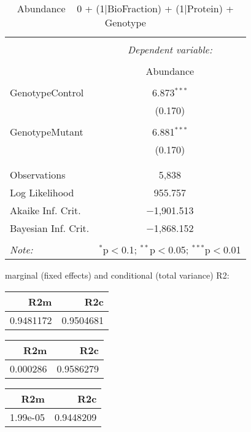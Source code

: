\documentclass[11pt]{report}
\begin{document}
\begin{table}[!htbp] \centering 
  \caption{Abundance ~ 0 + (1|BioFraction) + (1|Protein) + Genotype} 
  \label{} 
\begin{tabular}{@{\extracolsep{5pt}}lc} 
\\[-1.8ex]\hline 
\hline \\[-1.8ex] 
 & \multicolumn{1}{c}{\textit{Dependent variable:}} \\ 
\cline{2-2} 
\\[-1.8ex] & Abundance \\ 
\hline \\[-1.8ex] 
 GenotypeControl & 6.873$^{***}$ \\ 
  & (0.170) \\ 
  & \\ 
 GenotypeMutant & 6.881$^{***}$ \\ 
  & (0.170) \\ 
  & \\ 
\hline \\[-1.8ex] 
Observations & 5,838 \\ 
Log Likelihood & 955.757 \\ 
Akaike Inf. Crit. & $-$1,901.513 \\ 
Bayesian Inf. Crit. & $-$1,868.152 \\ 
\hline 
\hline \\[-1.8ex] 
\textit{Note:}  & \multicolumn{1}{r}{$^{*}$p$<$0.1; $^{**}$p$<$0.05; $^{***}$p$<$0.01} \\ 
\end{tabular} 
\end{table} 
marginal (fixed effects) and conditional (total variance) R2:

\begin{tabular}{r|r}
\hline
R2m & R2c\\
\hline
0.9481172 & 0.9504681\\
\hline
\end{tabular}

\begin{tabular}{r|r}
\hline
R2m & R2c\\
\hline
0.000286 & 0.9586279\\
\hline
\end{tabular}

\begin{tabular}{r|r}
\hline
R2m & R2c\\
\hline
1.99e-05 & 0.9448209\\
\hline
\end{tabular}
\end{document}
